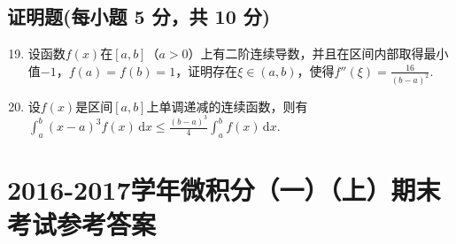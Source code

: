 \documentclass[../main.tex]{subfiles}
\begin{document}
\section{证明题(每小题 5 分，共 10 分)}
\begin{enumerate}
    \setcounter{enumi}{18}
    \item 设函数$f(x)$在$[a,b]$（$a>0$）上有二阶连续导数，并且在区间内部取得最小值$-
              1$，$f(a)=f(b)=1$，证明存在$\xi\in(a,b)$，使得$f''(\xi)=\frac{16}{(b-a)^{2}}$.
          \vspace{15em}

    \item 设$f(x)$是区间$[a,b]$上单调递减的连续函数，则有$\int_{a}^{b}(x-a)^{3}
              f(x)\,\mathrm{d}x\leq\frac{(b-a)^{3}}{4}\int_{a}^{b}f(x)\,\mathrm{d}x$.
          \vspace{15em}
\end{enumerate}

\chapter{2016-2017学年微积分（一）（上）期末考试参考答案}
\end{document}
